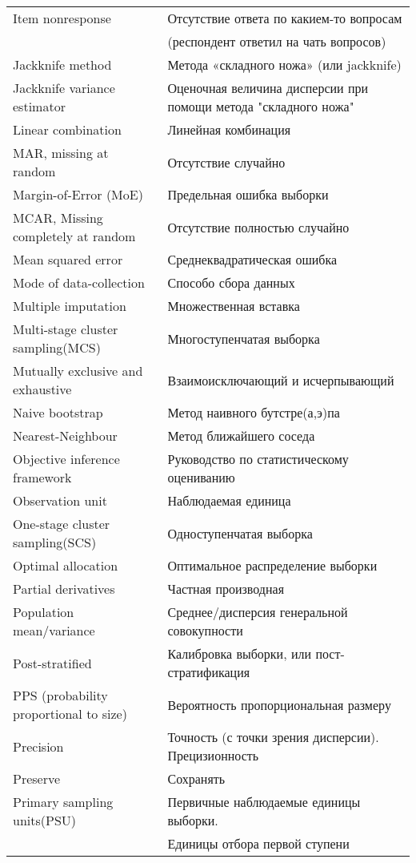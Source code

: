 \documentclass[12pt]{article}
\begin{document}
\begin{center}
\begin{tabular}{l|l}
\hline
Item nonresponse & Отсутствие ответа по какием-то вопросам \\&(респондент ответил на чать вопросов) \\
Jackknife method & Метода «складного ножа» (или jackknife) \\
Jackknife variance estimator & Оценочная величина дисперсии при помощи метода "складного ножа"\\
Linear combination & Линейная комбинация\\
MAR, missing at random & Отсутствие случайно\\
Margin-of-Error (MoE) & Предельная ошибка выборки\\
MCAR, Missing completely at random & Отсутствие полностью случайно\\
Mean squared error & Среднеквадратическая ошибка \\
Mode of data-collection & Способо сбора данных\\
Multiple imputation & Множественная вставка\\
Multi-stage cluster sampling(MCS) & Многоступенчатая выборка\\
Mutually exclusive and exhaustive& Взаимоисключающий и исчерпывающий\\ 
Naive bootstrap & Метод наивного бутстре(а,э)па\\
Nearest-Neighbour& Метод ближайшего соседа\\
Objective inference framework & Руководство по статистическому оцениванию\\
Observation unit & Наблюдаемая единица\\
One-stage cluster sampling(SCS) & Одноступенчатая выборка\\
Optimal allocation & Оптимальное распределение выборки\\
Partial derivatives & Частная производная\\
Population mean/variance & Среднее/дисперсия генеральной совокупности\\ 
Post-stratified & Калибровка выборки, или пост-стратификация\\
PPS (probability proportional to size) & Вероятность пропорциональная размеру\\
Precision & Точность (с точки зрения дисперсии). Прецизионность\\
Preserve & Сохранять\\
Primary sampling units(PSU)&Первичные наблюдаемые единицы выборки. \\ & Единицы отбора первой ступени \\

\end{tabular}
\end{center}
\end{document}
